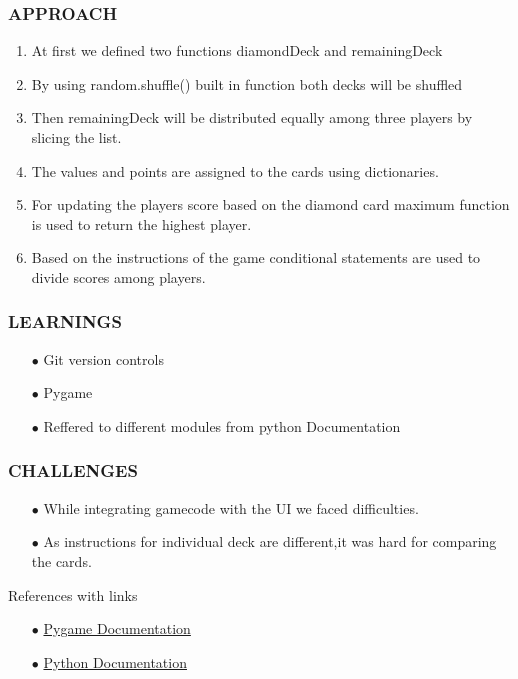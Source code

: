 \documentclass[12pt]{beamer}
\begin{document}
\begin{frame}
	\frametitle{APPROACH}
	\begin{enumerate}[label = \arabic*)]
	    \item At first we defined two functions diamondDeck and remainingDeck
        \item By using random.shuffle() built in function both decks will be shuffled 
        \item Then remainingDeck will be distributed equally among three players by slicing the list.
        \item The values and points are assigned to the cards using dictionaries.
        \item For updating the players score based on the diamond card maximum function is used to return the highest player.
        \item Based on the instructions of the game conditional statements are used to divide scores among players.
	\end{enumerate}
\end{frame}
\begin{frame}
    \frametitle{LEARNINGS}
    \begin{itemize}
        \item[$\bullet$] Git version controls
        \item[$\bullet$] Pygame
        \item[$\bullet$] Reffered to different modules from python Documentation
    \end{itemize}
\end{frame}
\begin{frame}
    \frametitle{CHALLENGES}
    \begin{itemize}
         \item[$\bullet$]While integrating gamecode with the UI we faced difficulties.
         \item[$\bullet$] As instructions for individual deck are different,it was hard for comparing the cards.
    \end{itemize}
\end{frame}
\begin{frame}{References with links}
\begin{itemize}
        \item[$\bullet$] \href{https://www.pygame.org/docs/}{Pygame Documentation}
        \item[$\bullet$] \href{https://docs.python.org/3/tutorial/}{Python Documentation}
        
    \end{itemize}
\end{frame}
\end{document}
